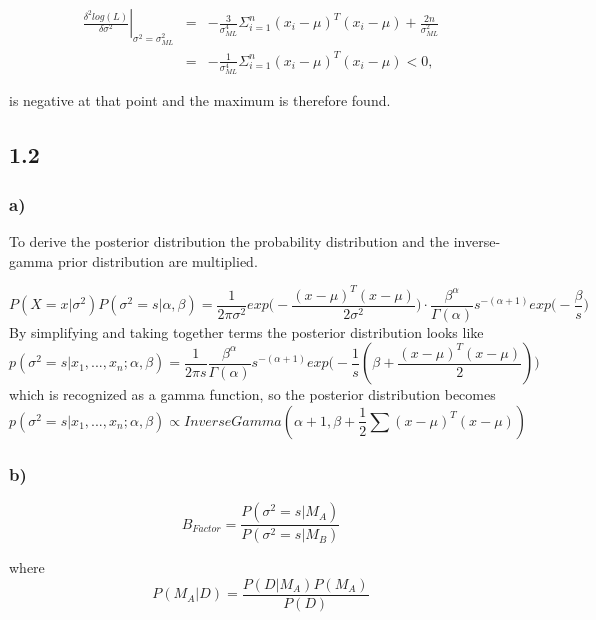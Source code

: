 \documentclass{article}
\begin{document}
\begin{equation}
\begin{array}{rcl}
\left.\frac{\delta^2 log(L)}{\delta\sigma^2}\right|_{\sigma^2=\sigma_{ML}^2} & = & -\frac{3}{\sigma^4_{ML}}\Sigma_{i=1}^{n}(x_i-\mu)^T(x_i-\mu)+\frac{2n}{\sigma^2_{ML}}\\
& = & -\frac{1}{\sigma^4_{ML}}\Sigma_{i=1}^{n}(x_i-\mu)^T(x_i-\mu) < 0,
\end{array}
\end{equation}

is negative at that point and the maximum is therefore found.

\subsection*{1.2}

\subsubsection*{a)}
To derive the posterior distribution the probability distribution and the inverse-gamma prior distribution are multiplied. 

$$ P(X =x|\sigma^2) P(\sigma^2=s|\alpha , \beta) = \frac{1}{2\pi \sigma^2} exp\Big(-\frac{(x - \mu)^T(x-\mu)}{2\sigma^2}\Big)\cdot \frac{\beta^{\alpha}}{\Gamma(\alpha)}s^{-(\alpha+1)}exp\Big(-\frac{\beta}{s}\Big) $$
\noindent By simplifying and taking together terms the posterior distribution looks like
$$p(\sigma^2 = s|x_1,...,x_n;\alpha,\beta) = \frac{1}{2\pi s}\frac{\beta^{\alpha}}{\Gamma({\alpha})}s^{-(\alpha + 1)}exp\Big(-\frac{1}{s}(\beta+\frac{(x-\mu)^T(x-\mu)}{2})\Big) $$
\noindent which is recognized as a gamma function, so the posterior distribution becomes
\begin{equation}
p(\sigma^2=s|x_1,...,x_n;\alpha,\beta) \propto InverseGamma(\alpha+1, \beta + \frac{1}{2}\sum(x-\mu)^{T}(x-\mu))
\end{equation}

\subsubsection*{b)}

\begin{equation}
B_{Factor}=\frac{P(\sigma^2=s|M_A)}{P(\sigma^2=s|M_B)}
\end{equation}

where
\begin{equation}
P(M_A|D)=\frac{P(D|M_A)P(M_A)}{P(D)}
\end{equation}
\end{document}
